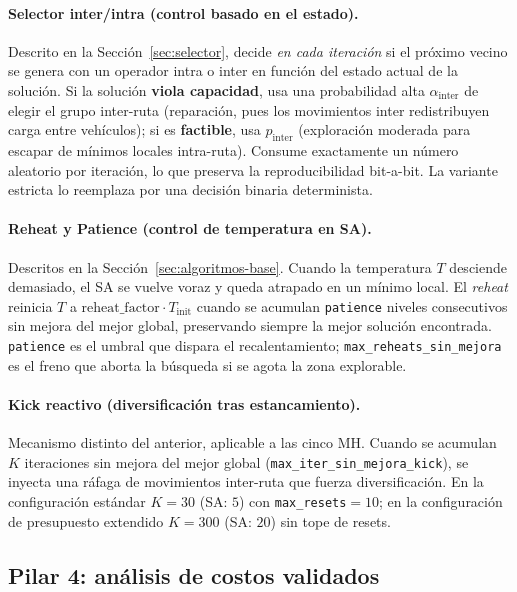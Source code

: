 \paragraph{Selector inter/intra (control basado en el estado).}
Descrito en la Sección~\ref{sec:selector}, decide \emph{en cada iteración}
si el próximo vecino se genera con un operador intra o inter en función del
estado actual de la solución. Si la solución \textbf{viola capacidad}, usa
una probabilidad alta $\alpha_{\text{inter}}$ de elegir el grupo inter-ruta
(reparación, pues los movimientos inter redistribuyen carga entre
vehículos); si es \textbf{factible}, usa $p_{\text{inter}}$ (exploración
moderada para escapar de mínimos locales intra-ruta). Consume exactamente
un número aleatorio por iteración, lo que preserva la reproducibilidad
bit-a-bit. La variante estricta lo reemplaza por una decisión binaria
determinista.

\paragraph{Reheat y Patience (control de temperatura en SA).}
Descritos en la Sección~\ref{sec:algoritmos-base}. Cuando la temperatura
$T$ desciende demasiado, el SA se vuelve voraz y queda atrapado en un mínimo
local. El \emph{reheat} reinicia $T$ a $\text{reheat\_factor} \cdot
T_{\text{init}}$ cuando se acumulan \texttt{patience} niveles consecutivos
sin mejora del mejor global, preservando siempre la mejor solución
encontrada. \texttt{patience} es el umbral que dispara el recalentamiento;
\texttt{max\_reheats\_sin\_mejora} es el freno que aborta la búsqueda si se
agota la zona explorable.

\paragraph{Kick reactivo (diversificación tras estancamiento).}
Mecanismo distinto del anterior, aplicable a las cinco MH. Cuando se
acumulan $K$ iteraciones sin mejora del mejor global
(\texttt{max\_iter\_sin\_mejora\_kick}), se inyecta una ráfaga de
movimientos inter-ruta que fuerza diversificación. En la configuración
estándar $K=30$ (SA: $5$) con \texttt{max\_resets}$=10$; en la
configuración de presupuesto extendido $K=300$ (SA: $20$) sin tope de
resets.

\subsection{Pilar 4: análisis de costos validados}
\label{subsec:pilar-costos}

